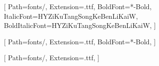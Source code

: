 [%
    Path=fonts/,
    Extension=.ttf,
    BoldFont=*-Bold,
    ItalicFont=HYZiKuTangSongKeBenLiKaiW,
    BoldItalicFont=HYZiKuTangSongKeBenLiKaiW,
]

[
    Path=fonts/,
    Extension=.ttf,
    BoldFont=*-Bold,
]

[
    Path=fonts/,
    Extension=.ttf,
]
